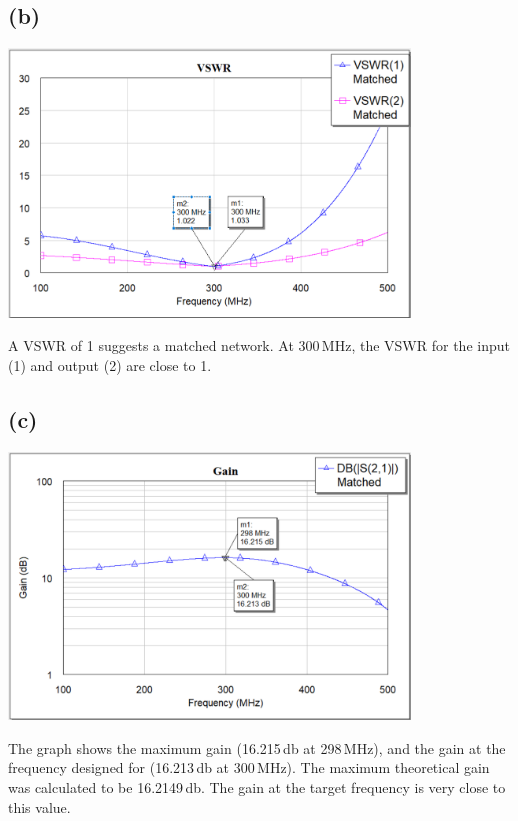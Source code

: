 \documentclass[12pt]{article}
\begin{document}
\subsection*{(b)}
\begin{center}
\includegraphics[width=0.8\textwidth]{1 vswr.png}
\end{center}

A VSWR of 1 suggests a matched network. At 300\,\unit{\mega\hertz}, the VSWR for the input (1) and output (2) are close to 1.

\subsection*{(c)}
\begin{center}
\includegraphics[width=0.8\textwidth]{1 gain.png}
\end{center}

The graph shows the maximum gain (16.215\,\unit{\decibel} at 298\,\unit{\mega\hertz}), and the gain at the frequency designed for (16.213\,\unit{\decibel} at 300\,\unit{\mega\hertz}).
The maximum theoretical gain was calculated to be 16.2149\,\unit{\decibel}.
The gain at the target frequency is very close to this value. 
\end{document}
